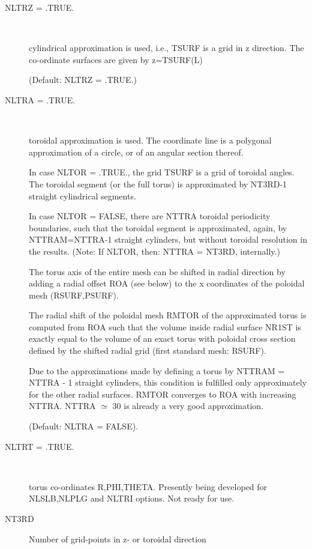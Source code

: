 \begin{description}
  \item[NLTRZ = .TRUE.
        ] ~

        cylindrical approximation is used, i.e., TSURF is a grid in z
        direction.
        The co-ordinate surfaces are given by z=TSURF(L) 

        (Default: NLTRZ = .TRUE.)

  \item[NLTRA = .TRUE.
        ] ~

        toroidal approximation is used.
        The coordinate line is a polygonal approximation of a circle, or of an angular
        section thereof.

        In case NLTOR = .TRUE., the  grid TSURF is a grid of toroidal
        angles.
        The toroidal segment (or the full torus) is approximated by NT3RD-1 straight
        cylindrical segments.

        In case NLTOR = FALSE, there are NTTRA toroidal periodicity boundaries, such
        that the toroidal segment is approximated, again, by NTTRAM=NTTRA-1 straight
        cylinders, but without toroidal resolution in the results.
        (Note: If NLTOR, then: NTTRA = NT3RD, internally.)

        The torus axis of the entire mesh can be shifted in radial direction by adding
        a radial offset ROA (see below) to the x coordinates of the poloidal mesh
        (RSURF,PSURF).

        The radial shift of the poloidal mesh RMTOR of the approximated torus is
        computed from ROA such that the volume inside radial surface NR1ST is exactly
        equal to the volume of an exact torus with poloidal cross section defined by
        the shifted radial grid (first standard mesh: RSURF).

        Due to the approximations made by defining a torus by NTTRAM = NTTRA - 1
        straight cylinders, this condition is fulfilled only approximately for the
        other radial surfaces.
        RMTOR converges to ROA with increasing NTTRA.
        NTTRA $\simeq$ 30 is already a very good approximation.

        (Default: NLTRA = FALSE).
  \item[NLTRT = .TRUE.
        ] ~

        torus co-ordinates R,PHI,THETA.
        Presently being developed for NLSLB,NLPLG and NLTRI options.
        Not ready for use.
  \item[NT3RD] Number of grid-points in z- or toroidal direction


\end{description}
